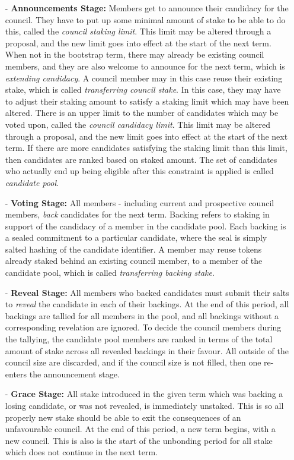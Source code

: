\documentclass{article}
\begin{document}
\begin{itemize}

\item[-] \textbf{Announcements Stage:} Members get to announce their candidacy for the council. They have to put up some minimal amount of stake to be able to do this, called the \textit{council staking limit}. This limit may be altered through a proposal, and the new limit goes into effect at the start of the next term. When not in the bootstrap term, there may already be existing council members, and they are also welcome to announce for the next term, which is \textit{extending candidacy}. A council member may in this case reuse their existing stake, which is called \textit{transferring council stake}. In this case, they may have to adjust their staking amount to satisfy a staking limit which may have been altered. There is an upper limit to the number of candidates which may be voted upon, called the \textit{council candidacy limit}. This limit may be altered through a proposal, and the new limit goes into effect at the start of the next term. If there are more candidates satisfying the staking limit than this limit, then candidates are ranked based on staked amount. The set of candidates who actually end up being eligible after this constraint is applied is called \textit{candidate pool}.

\item[-] \textbf{Voting Stage:} All members - including current and prospective council members, \textit{back} candidates for the next term. Backing refers to staking in support of the candidacy of a member in the candidate pool. Each backing is a sealed commitment to a particular candidate, where the seal is simply salted hashing of the candidate identifier. A member may reuse tokens already staked behind an existing council member, to a member of the candidate pool, which is called \textit{transferring backing stake}.

\item[-] \textbf{Reveal Stage:} All members who backed candidates must submit their salts to \textit{reveal} the candidate in each of their backings. At the end of this period, all backings are tallied for all members in the pool, and all backings without a corresponding revelation are ignored. To decide the council members during the tallying, the candidate pool members are ranked in terms of the total amount of stake across all revealed backings in their favour. All outside of the council size are discarded, and if the council size is not filled, then one re-enters the announcement stage.

\item[-] \textbf{Grace Stage:} All stake introduced in the given term which was backing a losing candidate, or was not revealed, is immediately unstaked. This is so all properly new stake should be able to exit the consequences of an unfavourable council. At the end of this period, a new term begins, with a new council. This is also is the start of the unbonding period for all stake which does not continue in the next term.

\end{itemize}
\end{document}
